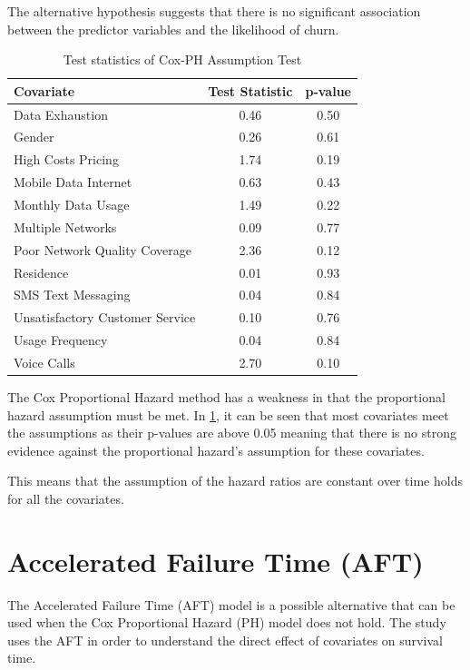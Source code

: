 \documentclass[doublespacing]{report} [12px]%
\begin{document}
The alternative hypothesis suggests that there is no significant association between the predictor variables and the likelihood of churn.


\begin{table}[H]
\centering

\begin{tabular}{lcc}
\toprule
Covariate& Test Statistic & p-value \\
\midrule
Data Exhaustion & 0.46 & 0.50 \\
Gender & 0.26 & 0.61 \\
High Costs Pricing & 1.74 & 0.19 \\
Mobile Data Internet & 0.63 & 0.43 \\
Monthly Data Usage & 1.49 & 0.22 \\
Multiple Networks & 0.09 & 0.77 \\
Poor Network Quality Coverage & 2.36 & 0.12 \\
Residence & 0.01 & 0.93 \\
SMS Text Messaging & 0.04 & 0.84 \\
Unsatisfactory Customer Service & 0.10 & 0.76 \\
Usage Frequency & 0.04 & 0.84 \\
Voice Calls & 2.70 & 0.10 \\
\bottomrule
\end{tabular}
\caption{Test statistics of Cox-PH Assumption Test}
\label{tab:test_statistics}
\end{table}


The Cox Proportional Hazard method has a weakness in that the proportional hazard assumption must be met. In \ref{tab:test_statistics}, it can be seen that most covariates meet the assumptions as their p-values are above 0.05 meaning that there is no strong evidence against the proportional hazard’s assumption for these covariates.

This means that the assumption of the hazard ratios are constant over time holds for all the covariates.



\section{Accelerated Failure Time (AFT) }

The Accelerated Failure Time (AFT) model is a possible alternative that can be used when the Cox Proportional Hazard (PH) model does not hold. The study uses the AFT in order to understand the direct effect of covariates on survival time.
\end{document}
